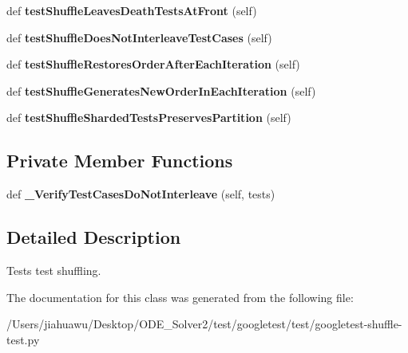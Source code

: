 \begin{DoxyCompactItemize}
def {\bfseries test\+Shuffle\+Leaves\+Death\+Tests\+At\+Front} (self)
\item 
\mbox{\label{classgoogletest-shuffle-test_1_1_g_test_shuffle_unit_test_a837b80b2c328cf030812d67b5d977b45}} 
def {\bfseries test\+Shuffle\+Does\+Not\+Interleave\+Test\+Cases} (self)
\item 
\mbox{\label{classgoogletest-shuffle-test_1_1_g_test_shuffle_unit_test_a04c8c704394572758647c8133e51e445}} 
def {\bfseries test\+Shuffle\+Restores\+Order\+After\+Each\+Iteration} (self)
\item 
\mbox{\label{classgoogletest-shuffle-test_1_1_g_test_shuffle_unit_test_ab87139a0521f324af16b086190a80601}} 
def {\bfseries test\+Shuffle\+Generates\+New\+Order\+In\+Each\+Iteration} (self)
\item 
\mbox{\label{classgoogletest-shuffle-test_1_1_g_test_shuffle_unit_test_a9e21814173c0822718d74c79c10e3b21}} 
def {\bfseries test\+Shuffle\+Sharded\+Tests\+Preserves\+Partition} (self)
\end{DoxyCompactItemize}
\subsection*{Private Member Functions}
\begin{DoxyCompactItemize}
\item 
\mbox{\label{classgoogletest-shuffle-test_1_1_g_test_shuffle_unit_test_a8021741dc0c7849d2242dc1f83b6ae23}} 
def {\bfseries \+\_\+\+Verify\+Test\+Cases\+Do\+Not\+Interleave} (self, tests)
\end{DoxyCompactItemize}


\subsection{Detailed Description}
\begin{DoxyVerb}Tests test shuffling.\end{DoxyVerb}
 

The documentation for this class was generated from the following file\+:\begin{DoxyCompactItemize}
\item 
/\+Users/jiahuawu/\+Desktop/\+O\+D\+E\+\_\+\+Solver2/test/googletest/test/googletest-\/shuffle-\/test.\+py\end{DoxyCompactItemize}

